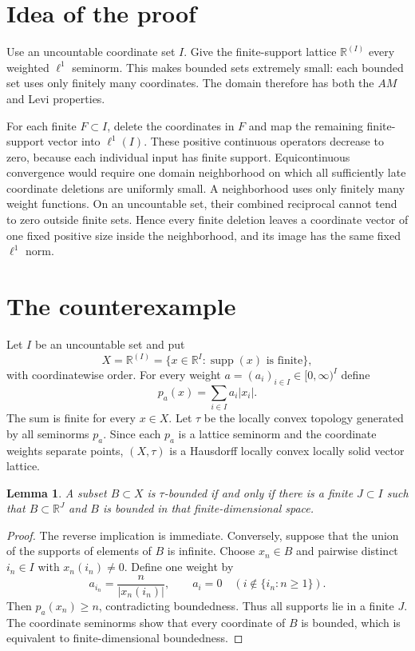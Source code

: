 \documentclass[11pt]{article}
\newtheorem{lemma}[theorem]{Lemma}
\newcommand{\R}{\mathbb R}
\newcommand{\supp}{\operatorname{supp}}
\begin{document}
\section{Idea of the proof}

Use an uncountable coordinate set $I$.  Give the finite-support lattice
$\R^{(I)}$ every weighted $\ell^1$ seminorm.  This makes bounded sets extremely
small: each bounded set uses only finitely many coordinates.  The domain
therefore has both the $AM$ and Levi properties.

For each finite $F\subset I$, delete the coordinates in $F$ and map the
remaining finite-support vector into $\ell^1(I)$.  These positive continuous
operators decrease to zero, because each individual input has finite support.
Equicontinuous convergence would require one domain neighborhood on which all
sufficiently late coordinate deletions are uniformly small.  A neighborhood
uses only finitely many weight functions.  On an uncountable set, their
combined reciprocal cannot tend to zero outside finite sets.  Hence every
finite deletion leaves a coordinate vector of one fixed positive size inside
the neighborhood, and its image has the same fixed $\ell^1$ norm.

\section{The counterexample}

Let $I$ be an uncountable set and put
\[
   X=\R^{(I)}
   =\{x\in\R^I:\supp(x)\text{ is finite}\},
\]
with coordinatewise order.  For every weight $a=(a_i)_{i\in I}\in[0,\infty)^I$
define
\[
   p_a(x)=\sum_{i\in I}a_i|x_i|.
\]
The sum is finite for every $x\in X$.  Let $\tau$ be the locally convex
topology generated by all seminorms $p_a$.  Since each $p_a$ is a lattice
seminorm and the coordinate weights separate points, $(X,\tau)$ is a
Hausdorff locally convex locally solid vector lattice.

\begin{lemma}\label{lem:bounded}
A subset $B\subset X$ is $\tau$-bounded if and only if there is a finite
$J\subset I$ such that $B\subset\R^J$ and $B$ is bounded in that
finite-dimensional space.
\end{lemma}

\begin{proof}
The reverse implication is immediate.  Conversely, suppose that the union of
the supports of elements of $B$ is infinite.  Choose $x_n\in B$ and pairwise
distinct $i_n\in I$ with $x_n(i_n)\ne0$.  Define one weight by
\[
   a_{i_n}=\frac{n}{|x_n(i_n)|},\qquad a_i=0
   \quad(i\notin\{i_n:n\ge1\}).
\]
Then $p_a(x_n)\ge n$, contradicting boundedness.  Thus all supports lie in a
finite $J$.  The coordinate seminorms show that every coordinate of $B$ is
bounded, which is equivalent to finite-dimensional boundedness.
\end{proof}
\end{document}
